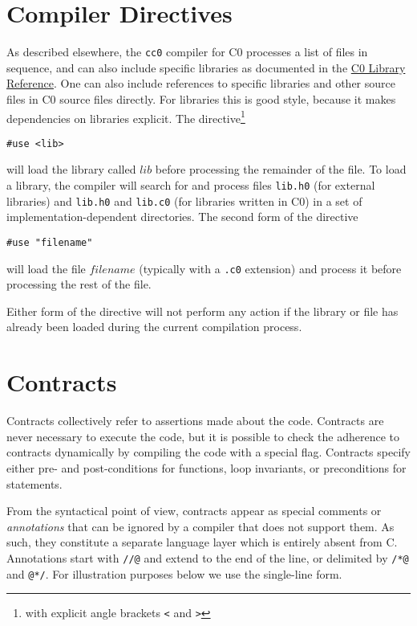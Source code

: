 \documentclass[11pt]{article}
\begin{document}
\section{Compiler Directives}

As described elsewhere, the \verb'cc0' compiler for C0 processes a
list of files in sequence, and can also include specific libraries as
documented in the
\href{http://www.cs.cmu.edu/~fp/courses/15122-s11/misc/c0-libraries.pdf}{C0
  Library Reference}.  One can also include references to specific
libraries and other source files in C0 source files directly.  For
libraries this is good style, because it makes dependencies on
libraries explicit.  The directive\footnote{with explicit angle
brackets \texttt{<} and \texttt{>}}
\begin{verbatim}
#use <lib>
\end{verbatim}
will load the library called $\mathit{lib}$ before processing the
remainder of the file.  To load a library, the compiler will search
for and process files \verb'lib.h0' (for external libraries) and
\verb'lib.h0' and \verb'lib.c0' (for libraries written in C0) in a set
of implementation-dependent directories.  The second form of the
directive
\begin{verbatim}
#use "filename"
\end{verbatim}
will load the file $\mathit{filename}$ (typically with a \verb'.c0'
extension) and process it before processing the rest of the file.

Either form of the directive will not perform any action if
the library or file has already been loaded during the current
compilation process.

\section{Contracts}
\label{sec:contracts}

Contracts collectively refer to assertions made about the code.
Contracts are never necessary to execute the code, but it is possible
to check the adherence to contracts dynamically by compiling the code
with a special flag.  Contracts specify either pre- and post-conditions
for functions, loop invariants, or preconditions for statements.

From the syntactical point of view, contracts appear as special
comments or \emph{annotations} that can be ignored by a compiler that
does not support them.  As such, they constitute a separate language
layer which is entirely absent from C\@.  Annotations start with
\verb'//@' and extend to the end of the line, or delimited
by \verb'/*@' and \verb'@*/'.  For illustration purposes below
we use the single-line form.
\end{document}
